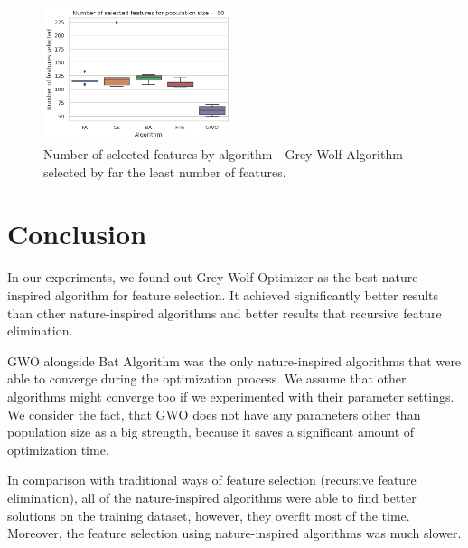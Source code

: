\documentclass[runningheads]{llncs}
\begin{document}
\begin{figure}[ht]
	\begin{center}
	    \includegraphics[width=5.5cm]{figures/nia_selected_features_by_algorithm.png}
    \end{center}
	\caption{Number of selected features by algorithm - Grey Wolf Algorithm selected by far the least number of features.}
	\label{fig:nia_selected_features_by_algorithm}
\end{figure}

\section{Conclusion}

In our experiments, we found out Grey Wolf Optimizer as the best nature-inspired algorithm for feature selection. It achieved significantly better results than other nature-inspired algorithms and better results that recursive feature elimination.

GWO alongside Bat Algorithm was the only nature-inspired algorithms that were able to converge during the optimization process. We assume that other algorithms might converge too if we experimented with their parameter settings. We consider the fact, that GWO does not have any parameters other than population size as a big strength, because it saves a significant amount of optimization time.

In comparison with traditional ways of feature selection (recursive feature elimination), all of the nature-inspired algorithms were able to find better solutions on the training dataset, however, they overfit most of the time. Moreover, the feature selection using nature-inspired algorithms was much slower.




\end{document}
